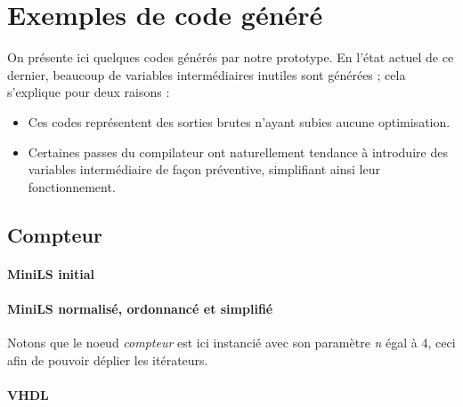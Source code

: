 \documentclass[a4paper]{article}
\begin{document}
\newpage
\tableofcontents

\newpage



\newpage
\appendix


\section{Exemples de code g\'en\'er\'e}

On pr\'esente ici quelques codes g\'en\'er\'es par notre prototype. En l'\'etat
actuel de ce dernier, beaucoup de variables interm\'ediaires inutiles sont
g\'en\'er\'ees ; cela s'explique pour deux raisons :

\begin{itemize}
\item Ces codes repr\'esentent des sorties brutes n'ayant subies aucune
  optimisation.
\item Certaines passes du compilateur ont naturellement tendance \`a introduire
  des variables interm\'ediaire de fa\c{c}on pr\'eventive, simplifiant ainsi leur
  fonctionnement.
\end{itemize}

\subsection{Compteur}

\paragraph{MiniLS initial}

\small

\normalsize

\paragraph{MiniLS normalis\'e, ordonnanc\'e et simplifi\'e}

Notons que le noeud \textit{compteur} est ici instanci\'e avec son param\`etre
\textit{n} \'egal \`a 4, ceci afin de pouvoir d\'eplier les it\'erateurs.

\small

\normalsize

\paragraph{VHDL}

\small

\normalsize
\end{document}
